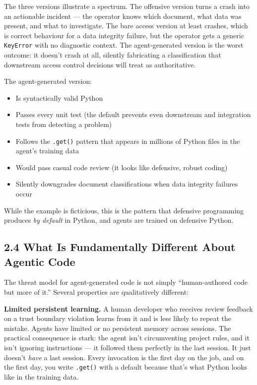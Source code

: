 \documentclass[a4paper,11pt]{report}
\providecommand{\tightlist}{%
  \setlength{\itemsep}{0pt}\setlength{\parskip}{0pt}}
\begin{document}
The three versions illustrate a spectrum. The offensive version turns a
crash into an actionable incident --- the operator knows which document,
what data was present, and what to investigate. The bare access version
at least crashes, which is correct behaviour for a data integrity
failure, but the operator gets a generic \texttt{KeyError} with no
diagnostic context. The agent-generated version is the worst outcome: it
doesn't crash at all, silently fabricating a classification that
downstream access control decisions will treat as authoritative.

The agent-generated version:

\begin{itemize}
\tightlist
\item
  Is syntactically valid Python
\item
  Passes every unit test (the default prevents even downstream and
  integration tests from detecting a problem)
\item
  Follows the \texttt{.get()} pattern that appears in millions of Python
  files in the agent's training data
\item
  Would pass casual code review (it looks like defensive, robust coding)
\item
  Silently downgrades document classifications when data integrity
  failures occur
\end{itemize}

While the example is ficticious, this is the pattern that defensive
programming produces \emph{by default} in Python, and agents are trained
on defensive Python.

\hypertarget{what-is-fundamentally-different-about-agentic-code}{%
\subsection{2.4 What Is Fundamentally Different About Agentic
Code}\label{what-is-fundamentally-different-about-agentic-code}}

The threat model for agent-generated code is not simply ``human-authored
code but more of it.'' Several properties are qualitatively different:

\textbf{Limited persistent learning.} A human developer who receives
review feedback on a trust boundary violation learns from it and is less
likely to repeat the mistake. Agents have limited or no persistent
memory across sessions. The practical consequence is stark: the agent
isn't circumventing project rules, and it isn't ignoring instructions
--- it followed them perfectly in the last session. It just doesn't
\emph{have} a last session. Every invocation is the first day on the
job, and on the first day, you write \texttt{.get()} with a default
because that's what Python looks like in the training data.
\end{document}
